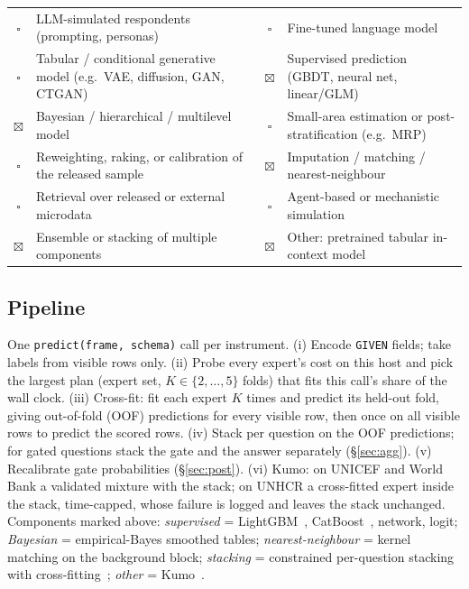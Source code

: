 \documentclass{article}
\newcommand{\cbox}{$\square$}
\newcommand{\cboxchecked}{$\boxtimes$}
\begin{document}
\begin{table}[h]
  \centering
  \small
  \begin{tabular}{@{}clcl@{}}
    \toprule
    \cbox & LLM-simulated respondents (prompting, personas) & \cbox & Fine-tuned language model \\
    \cbox & Tabular / conditional generative model (e.g.\ VAE, diffusion, GAN, CTGAN) & \cboxchecked & Supervised prediction (GBDT, neural net, linear/GLM) \\
    \cboxchecked & Bayesian / hierarchical / multilevel model & \cbox & Small-area estimation or post-stratification (e.g.\ MRP) \\
    \cbox & Reweighting, raking, or calibration of the released sample & \cboxchecked & Imputation / matching / nearest-neighbour \\
    \cbox & Retrieval over released or external microdata & \cbox & Agent-based or mechanistic simulation \\
    \cboxchecked & Ensemble or stacking of multiple components & \cboxchecked & Other: pretrained tabular in-context model \\
    \bottomrule
  \end{tabular}
\end{table}

\subsection{Pipeline}
\label{sec:pipeline}
One \texttt{predict(frame, schema)} call per instrument. (i) Encode \texttt{GIVEN} fields; take labels from visible rows only. (ii) Probe every expert's cost on this host and pick the largest plan (expert set, $K\in\{2,\dots,5\}$ folds) that fits this call's share of the wall clock. (iii) Cross-fit: fit each expert $K$ times and predict its held-out fold, giving out-of-fold (OOF) predictions for every visible row, then once on all visible rows to predict the scored rows. (iv) Stack per question on the OOF predictions; for gated questions stack the gate and the answer separately (\S\ref{sec:agg}). (v) Recalibrate gate probabilities (\S\ref{sec:post}). (vi) Kumo: on UNICEF and World Bank a validated mixture with the stack; on UNHCR a cross-fitted expert inside the stack, time-capped, whose failure is logged and leaves the stack unchanged. Components marked above: \emph{supervised} = LightGBM~\cite{ke2017lightgbm}, CatBoost~\cite{prokhorenkova2018catboost}, network, logit; \emph{Bayesian} = empirical-Bayes smoothed tables; \emph{nearest-neighbour} = kernel matching on the background block; \emph{stacking} = constrained per-question stacking~\cite{wolpert1992stacked,breiman1996stacked} with cross-fitting~\cite{chernozhukov2018double}; \emph{other} = Kumo~\cite{kumo2026}.
\end{document}

